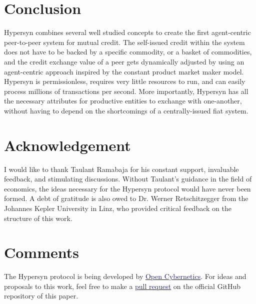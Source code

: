 \documentclass{article}
\begin{document}
\section{Conclusion}
\label{s: conclusion}

Hypersyn combines several well studied concepts to create the first agent-centric peer-to-peer system for mutual credit. The self-issued credit within the system does not have to be backed by a specific commodity, or a basket of commodities, and the credit exchange value of a peer gets dynamically adjusted by using an agent-centric approach inspired by the constant product market maker model. Hypersyn is permissionless, requires very little resources to run, and can easily process millions of transactions per second. More importantly, Hypersyn has all the necessary attributes for productive entities to exchange with one-another, without having to depend on the shortcomings of a centrally-issued fiat system.


\section{Acknowledgement}
I would like to thank Taulant Ramabaja for his constant support, invaluable feedback, and stimulating discussions. Without Taulant's guidance in the field of economics, the ideas necessary for the Hypersyn protocol would have never been formed. A debt of gratitude is also owed to Dr. Werner Retschitzegger from the Johannes Kepler University in Linz, who provided critical feedback on the structure of this work. 


\section{Comments}
The Hypersyn protocol is being developed by 
\href{https://www.opncbr.com}{\underline{\textcolor{MidnightBlue}{Open Cybernetics}}}. For ideas and proposals to this work, feel free to make a \href{https://github.com/LumRamabaja/Hypersyn-paper}{\underline{\textcolor{MidnightBlue}{pull request}}} on the official GitHub repository of this paper.


%
 

\end{document}
